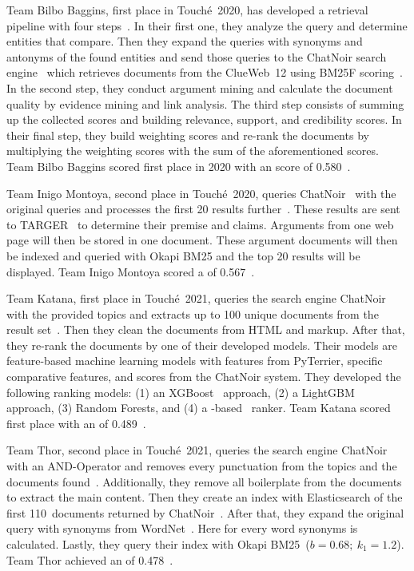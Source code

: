 Team Bilbo Baggins, first place in Touché~2020, has developed a retrieval pipeline with four steps~\cite{AbyeST2020}.
In their first one, they analyze the query and determine entities that compare.
Then they expand the queries with synonyms and antonyms of the found entities and send those queries to the ChatNoir search engine~\cite{BevendorffSHP2018} which retrieves documents from the ClueWeb~12 using BM25F scoring~\cite{PotthastHSGMTW2012}.
In the second step, they conduct argument mining and calculate the document quality by evidence mining and link analysis.
The third step consists of summing up the collected scores and building relevance, support, and credibility scores.
In their final step, they build weighting scores and re-rank the documents by multiplying the weighting scores with the sum of the aforementioned scores.
Team Bilbo Baggins scored first place in 2020 with an  score of 0.580~\cite{AbyeST2020}.

Team Inigo Montoya, second place in Touché~2020, queries ChatNoir~\cite{BevendorffSHP2018} with the original queries and processes the first 20 results further~\cite{Huck2020}.
These results are sent to TARGER~\cite{ChernodubOHBHBP2019} to determine their premise and claims.
Arguments from one web page will then be stored in one document.
These argument documents will then be indexed and queried with Okapi BM25 and the top 20 results will be displayed.
Team Inigo Montoya scored a  of 0.567~\cite{Huck2020}.

Team Katana, first place in Touché~2021, queries the search engine ChatNoir~\cite{BevendorffSHP2018} with the provided topics and extracts up to 100 unique documents from the result set~\cite{ChekalinaP2021}.
Then they clean the documents from HTML and markup.
After that, they re-rank the documents by one of their developed models.
Their models are feature-based machine learning models with features from PyTerrier, specific comparative features, and scores from the ChatNoir system. They developed the following ranking models:
(1) an XGBoost~\cite{ChenG2016} approach, (2) a LightGBM~\cite{KeMFWCMYL2017} approach, (3) Random Forests, and (4) a \Bert-based~\cite{DevlinCLT2019} ranker.
Team Katana scored first place with an  of 0.489~\cite{ChekalinaP2021}.

Team Thor, second place in Touché~2021, queries the search engine ChatNoir with an AND-Operator and removes every punctuation from the topics and the documents found~\cite{ShirshakovaW2021}.
Additionally, they remove all boilerplate from the documents to extract the main content.
Then they create an index with Elasticsearch of the first 110~documents returned by ChatNoir~\cite{BevendorffSHP2018}.
After that, they expand the original query with synonyms from WordNet~\cite{Miller1992}.
Here for every word synonyms is calculated.
Lastly, they query their index with Okapi BM25~(\( b = 0.68;~k_1 = 1.2 \)).
Team Thor achieved an  of 0.478~\cite{ShirshakovaW2021}.

